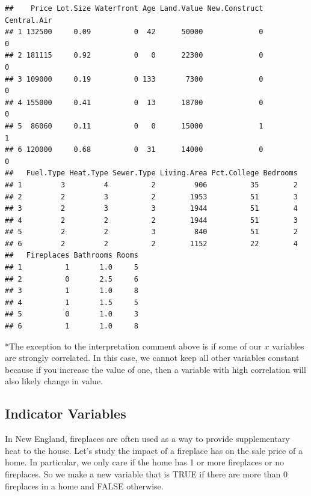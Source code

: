 \documentclass[]{book}
\newenvironment{Shaded}{\begin{snugshade}}{\end{snugshade}}
\newcommand{\DataTypeTok}[1]{\textcolor[rgb]{0.13,0.29,0.53}{#1}}
\newcommand{\DecValTok}[1]{\textcolor[rgb]{0.00,0.00,0.81}{#1}}
\newcommand{\KeywordTok}[1]{\textcolor[rgb]{0.13,0.29,0.53}{\textbf{#1}}}
\newcommand{\NormalTok}[1]{#1}
\newcommand{\OperatorTok}[1]{\textcolor[rgb]{0.81,0.36,0.00}{\textbf{#1}}}
\newcommand{\StringTok}[1]{\textcolor[rgb]{0.31,0.60,0.02}{#1}}
\begin{document}
\begin{verbatim}
##    Price Lot.Size Waterfront Age Land.Value New.Construct Central.Air
## 1 132500     0.09          0  42      50000             0           0
## 2 181115     0.92          0   0      22300             0           0
## 3 109000     0.19          0 133       7300             0           0
## 4 155000     0.41          0  13      18700             0           0
## 5  86060     0.11          0   0      15000             1           1
## 6 120000     0.68          0  31      14000             0           0
##   Fuel.Type Heat.Type Sewer.Type Living.Area Pct.College Bedrooms
## 1         3         4          2         906          35        2
## 2         2         3          2        1953          51        3
## 3         2         3          3        1944          51        4
## 4         2         2          2        1944          51        3
## 5         2         2          3         840          51        2
## 6         2         2          2        1152          22        4
##   Fireplaces Bathrooms Rooms
## 1          1       1.0     5
## 2          0       2.5     6
## 3          1       1.0     8
## 4          1       1.5     5
## 5          0       1.0     3
## 6          1       1.0     8
\end{verbatim}

*The exception to the interpretation comment above is if some of our \(x\) variables are strongly correlated. In this case, we cannot keep all other variables constant because if you increase the value of one, then a variable with high correlation will also likely change in value.

\hypertarget{indicator-variables}{%
\subsection{Indicator Variables}\label{indicator-variables}}

In New England, fireplaces are often used as a way to provide supplementary heat to the house. Let's study the impact of a fireplace has on the sale price of a home. In particular, we only care if the home has 1 or more fireplaces or no fireplaces. So we make a new variable that is TRUE if there are more than 0 fireplaces in a home and FALSE otherwise.

\begin{Shaded}
\end{Shaded}
\end{document}

